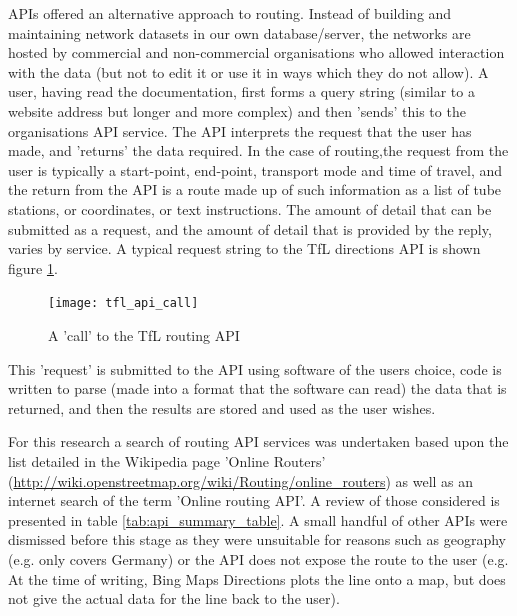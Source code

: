 APIs offered an alternative approach to routing. Instead of building and maintaining network datasets in our own database/server, the networks are hosted by commercial and non-commercial organisations who allowed interaction with the data (but not to edit it or use it in ways which they do not allow). A user, having read the documentation, first forms a query string (similar to a website address but longer and more complex) and then ’sends’ this to the organisations API service. The API interprets the request that the user has made, and ’returns’ the data required. In the case of routing,the request from the user is typically a start-point, end-point, transport mode and time of travel, and the return from the API is a route made up of such information as a list of tube stations, or coordinates, or text instructions. The amount of detail that can be submitted as a request, and the amount of detail that is provided by the reply, varies by service. A typical request string to the TfL directions API is shown figure \ref{fig:tfl_api_call}.

\begin{figure}[H]
\centering
\texttt{[image: tfl\_api\_call]}
\caption{A 'call' to the TfL routing API}
\label{fig:tfl_api_call}
\end{figure}

This 'request' is submitted to the API using software of the users choice, code is written to parse (made into a format that the software can read) the data that is returned, and then the results are stored and used as the user wishes.

For this research a search of routing API services was undertaken based upon the list detailed in the Wikipedia page 'Online Routers' (\url{http://wiki.openstreetmap.org/wiki/Routing/online_routers}) as well as an internet search of the term 'Online routing API'. A review of those considered is presented in table \ref{tab:api_summary_table}. A small handful of other APIs were dismissed before this stage as they were unsuitable for reasons such as geography (e.g. only covers Germany) or the API does not expose the route to the user (e.g. At the time of writing, Bing Maps Directions plots the line onto a map, but does not give the actual data for the line back to the user).

